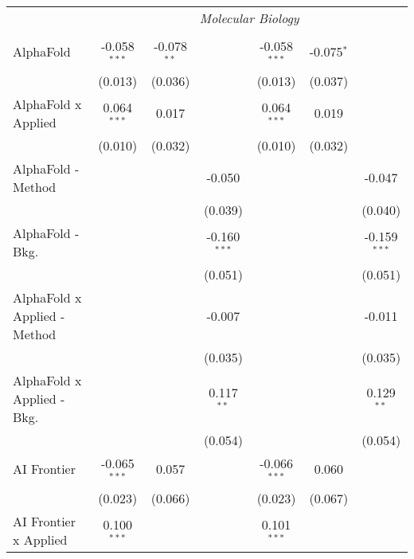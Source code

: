 \begin{tabular}{lcccccc}
 & \multicolumn{6}{c}{\textit{Molecular Biology}} \\ \\
   AlphaFold                    & -0.058$^{***}$ & -0.078$^{**}$ &                & -0.058$^{***}$ & -0.075$^{*}$ &   \\   
                                & (0.013)        & (0.036)       &                & (0.013)        & (0.037)      &   \\   
   AlphaFold x Applied          & 0.064$^{***}$  & 0.017         &                & 0.064$^{***}$  & 0.019        &   \\   
                                & (0.010)        & (0.032)       &                & (0.010)        & (0.032)      &   \\   
   AlphaFold - Method           &                &               & -0.050         &                &              & -0.047\\   
                                &                &               & (0.039)        &                &              & (0.040)\\   
   AlphaFold - Bkg.             &                &               & -0.160$^{***}$ &                &              & -0.159$^{***}$\\   
                                &                &               & (0.051)        &                &              & (0.051)\\   
   AlphaFold x Applied - Method &                &               & -0.007         &                &              & -0.011\\   
                                &                &               & (0.035)        &                &              & (0.035)\\   
   AlphaFold x Applied - Bkg.   &                &               & 0.117$^{**}$   &                &              & 0.129$^{**}$\\   
                                &                &               & (0.054)        &                &              & (0.054)\\   
   AI Frontier                  & -0.065$^{***}$ & 0.057         &                & -0.066$^{***}$ & 0.060        &   \\   
                                & (0.023)        & (0.066)       &                & (0.023)        & (0.067)      &   \\   
   AI Frontier x Applied        & 0.100$^{***}$  &               &                & 0.101$^{***}$  &              &   \\   

\end{tabular}
